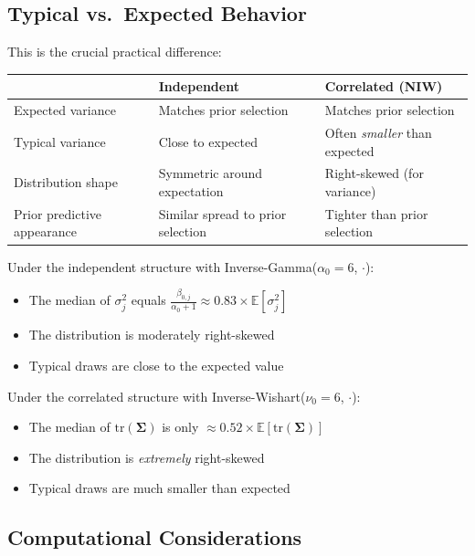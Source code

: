 \documentclass[11pt]{article}
\newcommand{\E}{\mathbb{E}}
\begin{document}
\subsection{Typical vs.\ Expected Behavior}

This is the crucial practical difference:

\begin{center}
\begin{tabular}{lp{5cm}p{5cm}}
\toprule
& \textbf{Independent} & \textbf{Correlated (NIW)} \\
\midrule
Expected variance & Matches prior selection & Matches prior selection \\
Typical variance & Close to expected & Often \textit{smaller} than expected \\
Distribution shape & Symmetric around expectation & Right-skewed (for variance) \\
Prior predictive appearance & Similar spread to prior selection & Tighter than prior selection \\
\bottomrule
\end{tabular}
\end{center}

Under the independent structure with Inverse-Gamma($\alpha_0 = 6$, $\cdot$):
\begin{itemize}
  \item The median of $\sigma_j^2$ equals $\frac{\beta_{0,j}}{\alpha_0 + 1} \approx 0.83 \times \E[\sigma_j^2]$
  \item The distribution is moderately right-skewed
  \item Typical draws are close to the expected value
\end{itemize}

Under the correlated structure with Inverse-Wishart($\nu_0 = 6$, $\cdot$):
\begin{itemize}
  \item The median of $\text{tr}(\boldsymbol{\Sigma})$ is only $\approx 0.52 \times \E[\text{tr}(\boldsymbol{\Sigma})]$
  \item The distribution is \textit{extremely} right-skewed
  \item Typical draws are much smaller than expected
\end{itemize}

\subsection{Computational Considerations}
\end{document}
